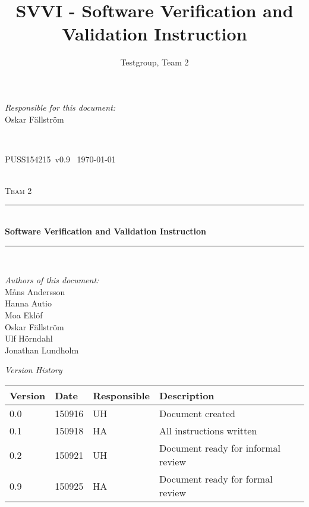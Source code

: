 \documentclass[a4paper]{article}
\title{SVVI - Software Verification and Validation Instruction}
\author{Testgroup, Team 2}
\newcommand{\version}{v0.9}
\newcommand{\SVVI}{PUSS154215}
\begin{document}
\begin{titlepage}
\newcommand{\HRule}{\rule{\linewidth}{0.5mm}}

\begin{minipage}{0.5\textwidth}
\begin{flushleft} %
\textit{Responsible for this document:}\\
Oskar Fällström %
\end{flushleft}
\end{minipage}
~
\begin{minipage}{0.4\textwidth}
\begin{flushright}
\SVVI\ \version\ %
\today
\end{flushright}
\end{minipage}\\[3cm]

\centering
\textsc{\LARGE Team 2}\\[0.5cm]

\HRule \\[0.4cm]
{ \huge \bfseries Software Verification and Validation Instruction}\\[0.4cm] %
\HRule \\[1.5cm]

\vfill
\begin{flushleft}
\textit{Authors of this document:}\\
Måns Andersson \\
Hanna Autio \\
Moa Eklöf \\
Oskar Fällström \\
Ulf Hörndahl \\
Jonathan Lundholm
\end{flushleft}


\end{titlepage}

\begin{center}
\textit{\large Version History}

    \begin{tabular}{ | l | l | l | p{5cm} |}
    \hline
    \textbf{Version}		& \textbf{Date}		& \textbf{Responsible}					& \textbf{Description}					\\ \hline
    0.0						& 150916 			& UH									& Document created						\\ \hline
    0.1						& 150918			& HA									& All instructions written				\\ \hline
    0.2						& 150921			& UH									& Document ready for informal review 	\\ \hline
    0.9						& 150925			& HA									& Document ready for formal review		\\ \hline
    \end{tabular}
\end{center}
\end{document}
